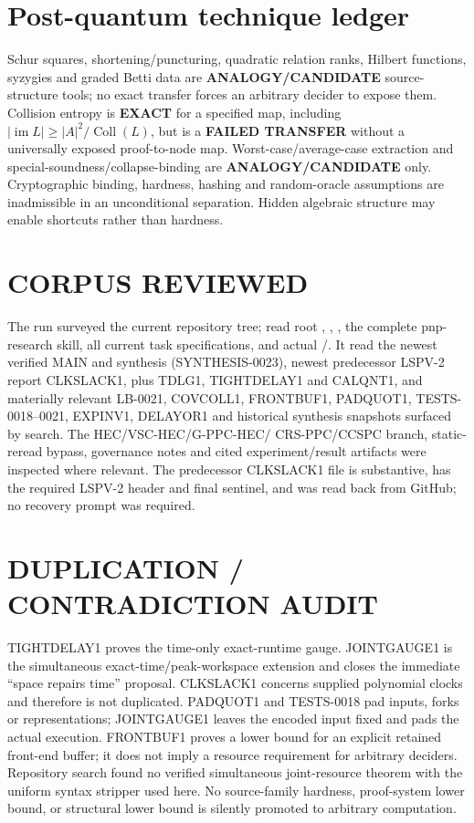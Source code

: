 \documentclass[11pt]{article}
\begin{document}
\section{Post-quantum technique ledger}

Schur squares, shortening/puncturing, quadratic relation ranks, Hilbert
functions, syzygies and graded Betti data are \textbf{ANALOGY/CANDIDATE}
source-structure tools; no exact transfer forces an arbitrary decider to expose
them.  Collision entropy is \textbf{EXACT} for a specified map, including
$|\operatorname{im}L|\ge |A|^2/\operatorname{Coll}(L)$, but is a
\textbf{FAILED TRANSFER} without a universally exposed proof-to-node map.
Worst-case/average-case extraction and special-soundness/collapse-binding are
\textbf{ANALOGY/CANDIDATE} only.  Cryptographic binding, hardness, hashing and
random-oracle assumptions are inadmissible in an unconditional separation.
Hidden algebraic structure may enable shortcuts rather than hardness.

\section{CORPUS REVIEWED}

The run surveyed the current repository tree; read root ,
, , the complete pnp-research skill, all current
task specifications, and actual /.  It read the
newest verified MAIN and synthesis (SYNTHESIS-0023), newest predecessor LSPV-2
report CLKSLACK1, plus TDLG1, TIGHTDELAY1 and CALQNT1, and materially relevant
LB-0021, COVCOLL1, FRONTBUF1, PADQUOT1, TESTS-0018--0021, EXPINV1, DELAYOR1 and
historical synthesis snapshots surfaced by search.  The HEC/VSC-HEC/G-PPC-HEC/
CRS-PPC/CCSPC branch, static-reread bypass, governance notes and cited
experiment/result artifacts were inspected where relevant.  The predecessor
CLKSLACK1 file is substantive, has the required LSPV-2 header and final
sentinel, and was read back from GitHub; no recovery prompt was required.

\section{DUPLICATION / CONTRADICTION AUDIT}

TIGHTDELAY1 proves the time-only exact-runtime gauge.  JOINTGAUGE1 is the
simultaneous exact-time/peak-workspace extension and closes the immediate
``space repairs time'' proposal.  CLKSLACK1 concerns supplied polynomial clocks
and therefore is not duplicated.  PADQUOT1 and TESTS-0018 pad inputs, forks or
representations; JOINTGAUGE1 leaves the encoded input fixed and pads the actual
execution.  FRONTBUF1 proves a lower bound for an explicit retained front-end
buffer; it does not imply a resource requirement for arbitrary deciders.
Repository search found no verified simultaneous joint-resource theorem with
the uniform syntax stripper used here.  No source-family hardness, proof-system
lower bound, or structural lower bound is silently promoted to arbitrary
computation.
\end{document}
